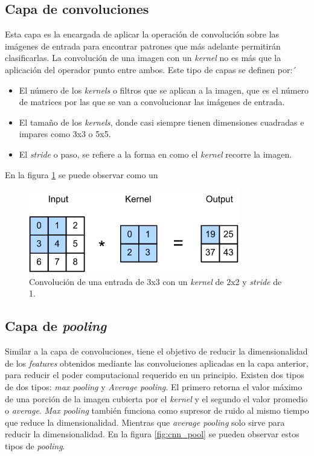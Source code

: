 \subsection{Capa de convoluciones}
Esta capa es la encargada de aplicar la operación de convolución sobre las imágenes de entrada para encontrar patrones que más adelante permitirán clasificarlas. La convolución de una imagen con un \textit{kernel} no es más que la aplicación del operador punto entre ambos. Este tipo de capas se definen por:´
\begin{itemize}
	\item El número de los \textit{kernels} o filtros que se aplican a la imagen, que es el número de matrices por las que se van a convolucionar las imágenes de entrada.
	\item El tamaño de los \textit{kernels}, donde casi siempre tienen dimensiones cuadradas e impares como 3x3 o 5x5.
	\item El \textit{stride} o paso, se refiere a la forma en como el \textit{kernel} recorre la imagen.
\end{itemize}

En la figura \ref{fig:cnn_conv} se puede observar como un

\begin{figure}[h]
	\centering
	\includegraphics[scale=0.7]{./Figures/cnn_conv.png}
	\caption{Convolución de una entrada de 3x3 con un \textit{kernel} de 2x2 y \textit{stride} de 1\protect\footnotemark.}
	\label{fig:cnn_conv}
\end{figure}

\subsection{Capa de \textit{pooling}}
Similar a la capa de convoluciones, tiene el objetivo de reducir la dimensionalidad de los \textit{features} obtenidos mediante las convoluciones aplicadas en la capa anterior, para reducir el poder computacional requerido en un principio. Existen dos tipos de dos tipos: \textit{max pooling} y \textit{Average pooling}. El primero retorna el valor máximo de una porción de la imagen cubierta por el \textit{kernel} y el segundo el valor promedio o \textit{average}. \textit{Max pooling} también funciona como supresor de ruido al mismo tiempo que reduce la dimensionalidad. Mientras que \textit{average pooling} solo sirve para reducir la dimensionalidad. En la figura \ref{fig:cnn_pool} se pueden observar estos tipos de \textit{pooling}.

